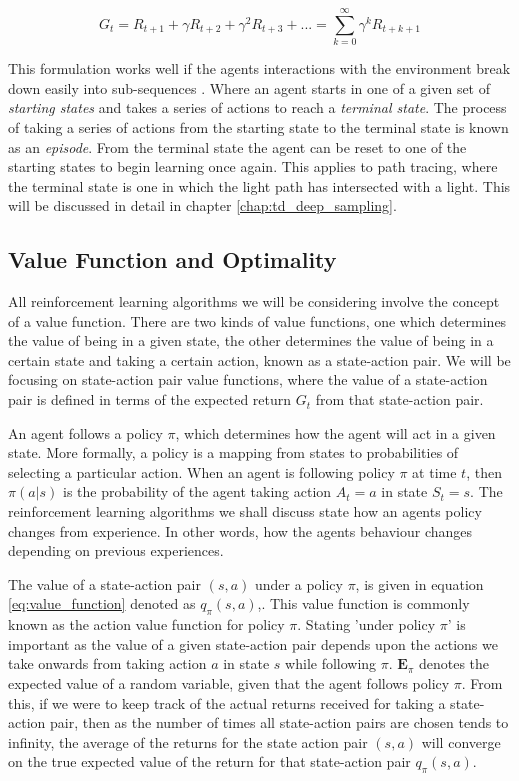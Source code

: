 \documentclass[../dissertation.tex]{subfiles}
\begin{document}
\begin{equation}
\label{eq:return}
G_t = R_{t+1} + \gamma R_{t+2} + \gamma^2 R_{t+3} + ... = \sum^\infty_{k=0} \gamma^k R_{t+k+1}
\end{equation}

This formulation works well if the agents interactions with the environment break down easily into sub-sequences \cite{sutton2011reinforcement}. Where an agent starts in one of a given set of \textit{starting states} and takes a series of actions to reach a \textit{terminal state}. The process of taking a series of actions from the starting state to the terminal state is known as an \textit{episode}. From the terminal state the agent can be reset to one of the starting states to begin learning once again. This applies to path tracing, where the terminal state is one in which the light path has intersected with a light. This will be discussed in detail in chapter \ref{chap:td_deep_sampling}.

\subsection{Value Function and Optimality}
\label{sec:optimal_value}
All reinforcement learning algorithms we will be considering involve the concept of a value function. There are two kinds of value functions, one which determines the value of being in a given state, the other determines the value of being in a certain state and taking a certain action, known as a state-action pair. We will be focusing on state-action pair value functions, where the value of a state-action pair is defined in terms of the expected return $G_t$ from that state-action pair.

An agent follows a policy $\pi$, which determines how the agent will act in a given state. More formally, a policy is a mapping from states to probabilities of selecting a particular action. When an agent is following policy $\pi$ at time $t$, then $\pi(a|s)$ is the probability of the agent taking action $A_t = a$ in state  $S_t = s$. The reinforcement learning algorithms we shall discuss state how an agents policy changes from experience. In other words, how the agents behaviour changes depending on previous experiences.

The value of a state-action pair $(s,a)$ under a policy $\pi$, is given in equation \ref{eq:value_function} denoted as $q_\pi(s,a)$,. This value function is commonly known as the action value function for policy $\pi$. Stating 'under policy $\pi$' is important as the value of a given state-action pair depends upon the actions we take onwards from taking action $a$ in state $s$ while following $\pi$. $\mathbf{E}_\pi$ denotes the expected value of a random variable, given that the agent follows policy $\pi$. From this, if we were to keep track of the actual returns received for taking a state-action pair, then as the number of times all state-action pairs are chosen tends to infinity, the average of the returns for the state action pair $(s,a)$ will converge on the true expected value of the return for that state-action pair $q_\pi(s,a)$.
\end{document}
